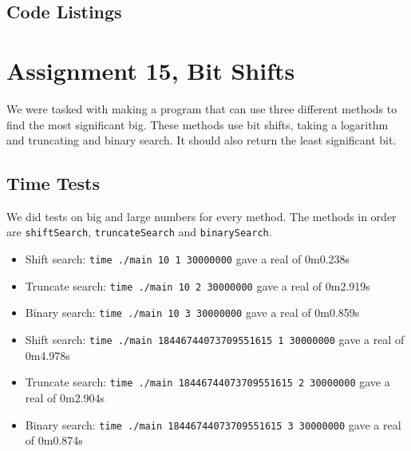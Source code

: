 \documentclass[a4paper]{article}
\begin{document}
\subsection*{Code Listings}










\section*{Assignment 15, Bit Shifts}
We were tasked with making a program that can use three different methods to find the most significant big.
These methods use bit shifts, taking a logarithm and truncating and binary search.
It should also return the least significant bit.

\subsection*{Time Tests}
We did tests on big and large numbers for every method.
The methods in order are \texttt{shiftSearch}, \texttt{truncateSearch} and \texttt{binarySearch}.

\begin{itemize}
\item Shift search: \texttt{time ./main 10 1 30000000} gave a real of 0m0.238s
\item Truncate search: \texttt{time ./main 10 2 30000000} gave a real of 0m2.919s
\item Binary search: \texttt{time ./main 10 3 30000000} gave a real of 0m0.859s
\end{itemize}

\begin{itemize}
\item Shift search: \texttt{time ./main 18446744073709551615 1 30000000} gave a real of 0m4.978s
\item Truncate search: \texttt{time ./main 18446744073709551615 2 30000000} gave a real of 0m2.904s
\item Binary search: \texttt{time ./main 18446744073709551615 3 30000000} gave a real of 0m0.874s
\end{itemize}
\end{document}
